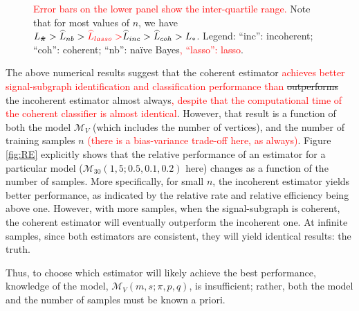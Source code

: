 \documentclass[10pt,journal,cspaper,compsoc]{IEEEtran}
\providecommand{\tr}[1]{\textcolor{red}{#1}}
\providecommand{\mc}[1]{\mathcal{#1}}
\providecommand{\wh}[1]{\widehat{#1}}
\providecommand{\mhb}[1]{\hat{\boldsymbol{#1}}}
\begin{document}
\begin{figure}[htbp]
{	\tr{Error bars on the lower panel show the inter-quartile range.}
	Note that for most values of $n$, we have $L_{\mhb{\pi}} > \wh{L}_{nb} > \tr{\wh{L}_{lasso} >} \wh{L}_{inc} > \wh{L}_{coh} > L_*$. Legend: ``inc'': incoherent; ``coh'': coherent; ``nb'': na\"ive Bayes\tr{, ``lasso'': lasso}.}
	\label{fig:homo}
\end{figure}



The above numerical results suggest that the coherent estimator \tr{achieves better signal-subgraph identification and classification performance than} \sout{outperforms} the incoherent estimator almost always\tr{, despite that the computational time of the coherent classifier is almost identical}.  However, that result is a function of both the model $\mc{M}_V$ (which includes the number of vertices), and the number of training samples $n$ \tr{(there is a bias-variance trade-off here, as always)}.  %
Figure \ref{fig:RE} explicitly shows that the relative performance of an estimator for a particular model ($\mc{M}_{30}(1,5;0.5,0.1,0.2)$ here) changes as a function of the number of samples.  More specifically, for small $n$, the incoherent estimator yields better performance, as indicated by the relative rate and relative efficiency being above one.  However, with more samples, when the signal-subgraph is coherent, the coherent estimator will eventually outperform the incoherent one.  At infinite samples, since both estimators are consistent, they will yield identical results: the truth.  

Thus, to choose which estimator will likely achieve the best performance, knowledge of the model, $\mc{M}_V(m,s;\pi,p,q)$, is insufficient; rather, both the model and the number of samples must be known a priori.  
\end{document}
